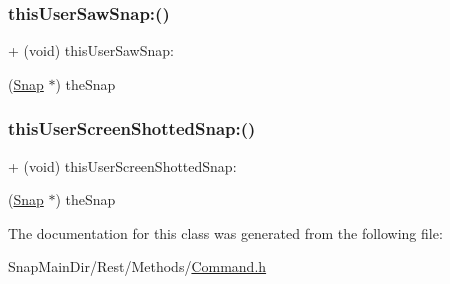 \subsubsection{\texorpdfstring{this\+User\+Saw\+Snap\+:()}{thisUserSawSnap:()}}
{\footnotesize\ttfamily + (void) this\+User\+Saw\+Snap\+: \begin{DoxyParamCaption}\item[{(\hyperlink{interface_snap}{Snap} $\ast$)}]{the\+Snap }\end{DoxyParamCaption}}

\hypertarget{interface_command_factory_a588a6fa21e8014e73b266f46c11ff113}{}\label{interface_command_factory_a588a6fa21e8014e73b266f46c11ff113} 
\subsubsection{\texorpdfstring{this\+User\+Screen\+Shotted\+Snap\+:()}{thisUserScreenShottedSnap:()}}
{\footnotesize\ttfamily + (void) this\+User\+Screen\+Shotted\+Snap\+: \begin{DoxyParamCaption}\item[{(\hyperlink{interface_snap}{Snap} $\ast$)}]{the\+Snap }\end{DoxyParamCaption}}



The documentation for this class was generated from the following file\+:\begin{DoxyCompactItemize}
\item 
Snap\+Main\+Dir/\+Rest/\+Methods/\hyperlink{_command_8h}{Command.\+h}\end{DoxyCompactItemize}
